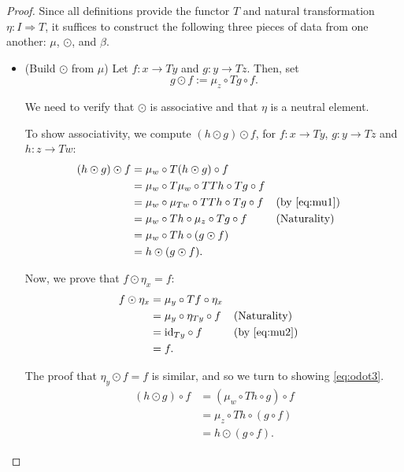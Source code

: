 \documentclass[11pt]{article}
\theoremstyle{nonumberplain}
\newtheorem{proof}{Proof}
\newcommand{\id}{\mathrm{id}}
\begin{document}
\begin{proof}
Since all definitions provide the functor $T$ and natural transformation $\eta \colon I \Rightarrow T$, it suffices to construct the following three pieces of data from one another: $\mu$, $\odot$, and $\beta$.

\begin{itemize}
\item (Build $\odot$ from $\mu$) Let $f \colon x \to T y$ and $g \colon y \to T z$. Then, set
\begin{equation}
g \odot f := \mu_z \circ Tg \circ f.
\end{equation}

We need to verify that $\odot$ is associative and that $\eta$ is a neutral element.

To show associativity, we compute $(h \odot g) \odot f$, for $f \colon x \to Ty$, $g \colon y \to Tz$ and $h \colon z \to Tw$:
\begin{equation}
\begin{aligned}
(h \odot g) \odot f &= \mu_w \circ T(h \odot g) \circ f\\
&= \mu_w \circ T\mu_w \circ TTh \circ Tg \circ f\\
&= \mu_w \circ \mu_{Tw} \circ TTh \circ Tg \circ f &&\text{(by \eqref{eq:mu1})}\\
&= \mu_w \circ Th \circ \mu_{z} \circ Tg \circ f &&\text{(Naturality)} \\
&= \mu_w \circ Th \circ (g \odot f)\\
&= h \odot (g \odot f).
\end{aligned}
\end{equation}

Now, we prove that $f \odot \eta_x = f$:
\begin{equation}
\begin{aligned}
f \odot \eta_x &= \mu_y \circ Tf \circ \eta_x\\
&= \mu_y \circ \eta_{Ty} \circ f &&\text{(Naturality)} \\
&= \id_{T y} \circ f &&\text{(by \eqref{eq:mu2})}\\
&= f.
\end{aligned}
\end{equation}

The proof that $\eta_y \odot f = f$ is similar, and so we turn to showing \eqref{eq:odot3}.
\begin{equation}
\begin{aligned}
(h \odot g) \circ f &= (\mu_w \circ Th \circ g) \circ f\\
&= \mu_z \circ Th \circ (g \circ f)\\
&= h \odot (g \circ f).
\end{aligned}
\end{equation}


\end{itemize}
\end{proof}
\end{document}
